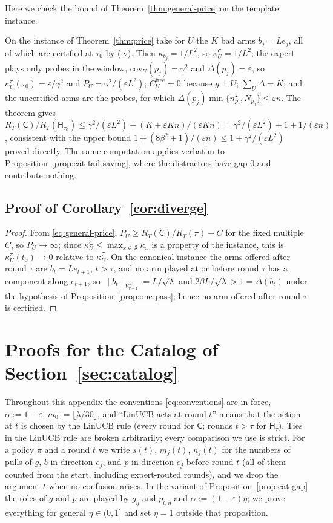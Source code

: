 \documentclass[anon]{alt2027} %
\newcommand{\eps}{\varepsilon}
\newcommand{\Cold}{\mathsf{C}}
\newcommand{\Hyb}{\mathsf{H}}
\begin{document}
Here we check the bound of Theorem~\ref{thm:general-price} on the template
instance.

On the instance of Theorem~\ref{thm:price} take for $U$ the $K$ bad arms
$b_j=Le_j$, all of which are certified at $\tau_0$ by (iv). Then
$\kappa_{b_j}=1/L^2$, so $\kappa^{\Cold}_U=1/L^2$;
the expert plays only probes in the window, $\mathrm{cov}_U(p_j)=\gamma^2$ and
$\Delta(p_j)=\eps$, so $\kappa^\pi_U(\tau_0)=\eps/\gamma^2$ and $P_U=\gamma^2/(\eps L^2)$;
$C^{\mathrm{free}}_U=0$ because $g\perp U$; $\sum_U\Delta=K$; and the
uncertified arms are the probes, for which
$\Delta(p_j)\min\{n^\star_{p_j},N_{p_j}\}\le\eps n$. The theorem gives
$R_T(\Cold)/R_T(\Hyb_{\tau_0})\le \gamma^2/(\eps L^2)+(K+\eps Kn)/(\eps Kn)=\gamma^2/(\eps L^2)+1+1/(\eps n)$,
consistent with the upper bound $1+(8\beta^2+1)/(\eps n)\le1+\gamma^2/(\eps L^2)$
proved directly. The same computation applies verbatim to
Proposition~\ref{prop:cat-tail-saving}, where the distractors have gap $0$
and contribute nothing.

\subsection{Proof of Corollary~\ref{cor:diverge}}
\label{app:proof-diverge}

\begin{proof}
From \eqref{eq:general-price}, $P_U\ge R_T(\Cold)/R_T(\pi)-C$ for the
fixed multiple $C$, so $P_U\to\infty$; since $\kappa^{\Cold}_U\le\max_{x\in\mathcal S}\kappa_x$ is a
property of the instance, this is $\kappa^\pi_U(t_0)\to0$ relative to $\kappa^{\Cold}_U$.
On the canonical instance the arms offered after round $\tau$ are
$b_t=Le_{t+1}$, $t>\tau$, and no arm played at or before round $\tau$ has a
component along $e_{t+1}$, so $\|b_t\|_{V_{\tau+1}^{-1}}=L/\sqrt\lambda$ and
$2\beta L/\sqrt\lambda>1=\Delta(b_t)$ under the hypothesis of
Proposition~\ref{prop:one-pass}; hence no arm offered after round $\tau$ is certified.
\end{proof}

\section{Proofs for the Catalog of Section~\ref{sec:catalog}}
\label{app:catalog}

Throughout this appendix the conventions \eqref{eq:conventions} are in force,
$\alpha:=1-\eps$, $m_0:=\lfloor\lambda/30\rfloor$, and ``LinUCB acts at round
$t$'' means that the action at $t$ is chosen by the LinUCB rule (every round
for $\Cold$; rounds $t>\tau$ for $\Hyb_\tau$). Ties in the LinUCB rule are
broken arbitrarily; every comparison we use is strict. For a policy $\pi$ and
a round $t$ we write $s(t)$, $m_j(t)$, $n_j(t)$ for the numbers of pulls of
$g$, $b$ in direction $e_j$, and $p$ in direction $e_j$ before round $t$
(all of them counted from the start, including expert-routed rounds), and we
drop the argument $t$ when no confusion arises. In the variant of
Proposition~\ref{prop:cat-gap} the roles of $g$ and $p$ are played by
$g_\eta$ and $p_{t,\eta}$ and $\alpha:=(1-\eps)\eta$; we prove everything for
general $\eta\in(0,1]$ and set $\eta=1$ outside that proposition.
\end{document}
